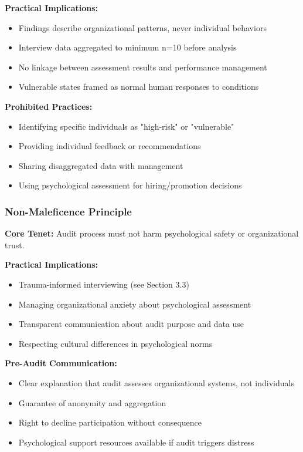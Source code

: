 \documentclass[11pt,a4paper]{article}
\begin{document}
\textbf{Practical Implications:}
\begin{itemize}
\item Findings describe organizational patterns, never individual behaviors
\item Interview data aggregated to minimum n=10 before analysis
\item No linkage between assessment results and performance management
\item Vulnerable states framed as normal human responses to conditions
\end{itemize}

\textbf{Prohibited Practices:}
\begin{itemize}
\item Identifying specific individuals as "high-risk" or "vulnerable"
\item Providing individual feedback or recommendations
\item Sharing disaggregated data with management
\item Using psychological assessment for hiring/promotion decisions
\end{itemize}

\subsubsection{Non-Maleficence Principle}

\textbf{Core Tenet:} Audit process must not harm psychological safety or organizational trust.

\textbf{Practical Implications:}
\begin{itemize}
\item Trauma-informed interviewing (see Section 3.3)
\item Managing organizational anxiety about psychological assessment
\item Transparent communication about audit purpose and data use
\item Respecting cultural differences in psychological norms
\end{itemize}

\textbf{Pre-Audit Communication:}
\begin{itemize}
\item Clear explanation that audit assesses organizational systems, not individuals
\item Guarantee of anonymity and aggregation
\item Right to decline participation without consequence
\item Psychological support resources available if audit triggers distress
\end{itemize}
\end{document}

